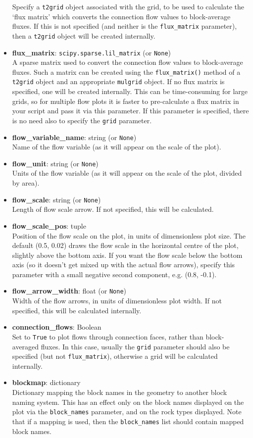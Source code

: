\begin{itemize}
  Specify a \texttt{t2grid} object associated with the grid, to be used to calculate the `flux matrix' which converts the connection flow values to block-average fluxes.  If this is not specified (and neither is the \texttt{flux\_matrix} parameter), then a \texttt{t2grid} object will be created internally.
\item \textbf{flux\_matrix}: \texttt{scipy.sparse.lil\_matrix} (or \texttt{None})\\
  A sparse matrix used to convert the connection flow values to block-average fluxes.  Such a matrix can be created using the \texttt{flux\_matrix()} method of a \texttt{t2grid} object and an appropriate \texttt{mulgrid} object.  If no flux matrix is specified, one will be created internally.  This can be time-consuming for large grids, so for multiple flow plots it is faster to pre-calculate a flux matrix in your script and pass it via this parameter.  If this parameter is specified, there is no need also to specify the \texttt{grid} parameter.
\item \textbf{flow\_variable\_name}: string (or \texttt{None})\\
  Name of the flow variable (as it will appear on the scale of the plot).
\item \textbf{flow\_unit}: string (or \texttt{None})\\
  Units of the flow variable (as it will appear on the scale of the plot, divided by area).
\item \textbf{flow\_scale}: string (or \texttt{None})\\
  Length of flow scale arrow.  If not specified, this will be calculated.
\item \textbf{flow\_scale\_pos}: tuple\\
  Position of the flow scale on the plot, in units of dimensionless plot size.  The default (0.5, 0.02) draws the flow scale in the horizontal centre of the plot, slightly above the bottom axis.  If you want the flow scale below the bottom axis (so it doesn't get mixed up with the actual flow arrows), specify this parameter with a small negative second component, e.g. (0.8, -0.1).
\item \textbf{flow\_arrow\_width}: float (or \texttt{None})\\
  Width of the flow arrows, in units of dimensionless plot width.  If not specified, this will be calculated internally.
\item \textbf{connection\_flows}: Boolean\\
  Set to \texttt{True} to plot flows through connection faces, rather than block-averaged fluxes.  In this case, usually the \texttt{grid} parameter should also be specified (but not \texttt{flux\_matrix}), otherwise a grid will be calculated internally.
\item \textbf{blockmap}: dictionary\\
  Dictionary mapping the block names in the geometry to another block naming system. This has an effect only on the block names displayed on the plot via the \texttt{block\_names} parameter, and on the rock types displayed. Note that if a mapping is used, then the \texttt{block\_names} list should contain mapped block names.
\end{itemize}

